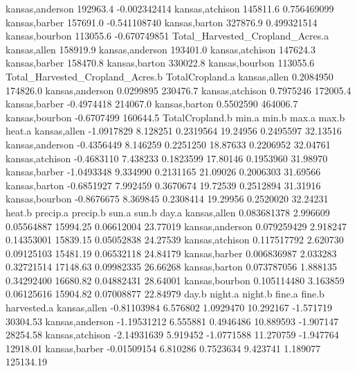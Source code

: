 \documentclass{report}
\begin{document}
\begin{Schunk}
\begin{Soutput}
kansas,anderson                 192963.4             -0.002342414
kansas,atchison                 145811.6              0.756469099
kansas,barber                   157691.0             -0.541108740
kansas,barton                   327876.9              0.499321514
kansas,bourbon                  113055.6             -0.670749851
                Total_Harvested_Cropland_Acres.a
kansas,allen                            158919.9
kansas,anderson                         193401.0
kansas,atchison                         147624.3
kansas,barber                           158470.8
kansas,barton                           330022.8
kansas,bourbon                          113055.6
                Total_Harvested_Cropland_Acres.b TotalCropland.a
kansas,allen                           0.2084950        174826.0
kansas,anderson                        0.0299895        230476.7
kansas,atchison                        0.7975246        172005.4
kansas,barber                         -0.4974418        214067.0
kansas,barton                          0.5502590        464006.7
kansas,bourbon                        -0.6707499        160644.5
                TotalCropland.b    min.a     min.b    max.a     max.b   heat.a
kansas,allen         -1.0917829 8.128251 0.2319564 19.24956 0.2495597 32.13516
kansas,anderson      -0.4356449 8.146259 0.2251250 18.87633 0.2206952 32.04761
kansas,atchison      -0.4683110 7.438233 0.1823599 17.80146 0.1953960 31.98970
kansas,barber        -1.0493348 9.334990 0.2131165 21.09026 0.2006303 31.69566
kansas,barton        -0.6851927 7.992459 0.3670674 19.72539 0.2512894 31.31916
kansas,bourbon       -0.8676675 8.369845 0.2308414 19.29956 0.2520020 32.24231
                     heat.b precip.a   precip.b    sun.a      sun.b    day.a
kansas,allen    0.083681378 2.996609 0.05564887 15994.25 0.06612004 23.77019
kansas,anderson 0.079259429 2.918247 0.14353001 15839.15 0.05052838 24.27539
kansas,atchison 0.117517792 2.620730 0.09125103 15481.19 0.06532118 24.84179
kansas,barber   0.006836987 2.033283 0.32721514 17148.63 0.09982335 26.66268
kansas,barton   0.073787056 1.888135 0.34292400 16680.82 0.04882431 28.64001
kansas,bourbon  0.105114480 3.163859 0.06125616 15904.82 0.07008877 22.84979
                      day.b  night.a    night.b    fine.a    fine.b harvested.a
kansas,allen    -0.81103984 6.576802  1.0929470 10.292167 -1.571719    30304.53
kansas,anderson -1.19531212 6.555881  0.4946486 10.889593 -1.907147    28254.58
kansas,atchison -2.14931639 5.919452 -1.0771588 11.270759 -1.947764    12918.01
kansas,barber   -0.01509154 6.810286  0.7523634  9.423741  1.189077   125134.19

\end{Soutput}
\end{Schunk}
\end{document}
